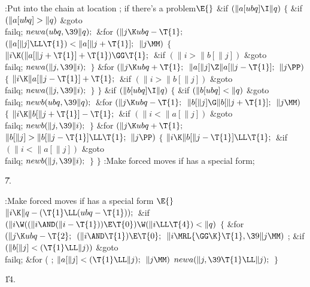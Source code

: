 \Y\B\4:Put  into the chain at location ;  if there's a problem\X${}\E{}$\6
\&{if} ${}(\|a[\\{ubq}]\I\|q){}$\5
${}\{{}$\1\6
\&{if} ${}(\|a[\\{ubq}]>\|q){}$\1\5
\&{goto} \\{failq};\2\6
${}\\{newa}(\\{ubq},\39\|q);{}$\6
\&{for} ${}(\|j\K\\{ubq}-\T{1};{}$ ${}(\|a[\|j]\LL\T{1})<\|a[\|j+\T{1}];{}$ ${}%
\|j\MM){}$\5
${}\{{}$\1\6
${}\|i\K(\|a[\|j+\T{1}]+\T{1})\GG\T{1};{}$\6
\&{if} ${}(\|i>\|b[\|j]){}$\1\5
\&{goto} \\{failq};\2\6
${}\\{newa}(\|j,\39\|i);{}$\6
\4${}\}{}$\2\6
\&{for} ${}(\|j\K\\{ubq}+\T{1};{}$ ${}\|a[\|j]\Z\|a[\|j-\T{1}];{}$ ${}\|j%
\PP){}$\5
${}\{{}$\1\6
${}\|i\K\|a[\|j-\T{1}]+\T{1};{}$\6
\&{if} ${}(\|i>\|b[\|j]){}$\1\5
\&{goto} \\{failq};\2\6
${}\\{newa}(\|j,\39\|i);{}$\6
\4${}\}{}$\2\6
\4${}\}{}$\2\6
\&{if} ${}(\|b[\\{ubq}]\I\|q){}$\5
${}\{{}$\1\6
\&{if} ${}(\|b[\\{ubq}]<\|q){}$\1\5
\&{goto} \\{failq};\2\6
${}\\{newb}(\\{ubq},\39\|q);{}$\6
\&{for} ${}(\|j\K\\{ubq}-\T{1};{}$ ${}\|b[\|j]\G\|b[\|j+\T{1}];{}$ ${}\|j%
\MM){}$\5
${}\{{}$\1\6
${}\|i\K\|b[\|j+\T{1}]-\T{1};{}$\6
\&{if} ${}(\|i<\|a[\|j]){}$\1\5
\&{goto} \\{failq};\2\6
${}\\{newb}(\|j,\39\|i);{}$\6
\4${}\}{}$\2\6
\&{for} ${}(\|j\K\\{ubq}+\T{1};{}$ ${}\|b[\|j]>\|b[\|j-\T{1}]\LL\T{1};{}$ ${}%
\|j\PP){}$\5
${}\{{}$\1\6
${}\|i\K\|b[\|j-\T{1}]\LL\T{1};{}$\6
\&{if} ${}(\|i<\|a[\|j]){}$\1\5
\&{goto} \\{failq};\2\6
${}\\{newb}(\|j,\39\|i);{}$\6
\4${}\}{}$\2\6
\4${}\}{}$\2\6
:Make forced moves if  has a special form\X;\par
\U7.\fi

\B{}:Make forced moves if  has a special form%
\X${}\E{}$\6
$\|i\K\|q-(\T{1}\LL(\\{ubq}-\T{1}));{}$\6
\&{if} ${}(\|i\W((\|i\AND(\|i-\T{1}))\E\T{0})\W(\|i\LL\T{4})<\|q){}$\5
${}\{{}$\1\6
\&{for} ${}(\|j\K\\{ubq}-\T{2};{}$ ${}(\|i\AND\T{1})\E\T{0};{}$ ${}\|i\MRL{{%
\GG}{\K}}\T{1},\39\|j\MM){}$\1\5
;\2\6
\&{if} ${}(\|b[\|j]<(\T{1}\LL\|j)){}$\1\5
\&{goto} \\{failq};\2\6
\&{for} ( ; ${}\|a[\|j]<(\T{1}\LL\|j);{}$ ${}\|j\MM){}$\1\5
${}\\{newa}(\|j,\39\T{1}\LL\|j);{}$\2\6
\4${}\}{}$\2\par
\U14.\fi


